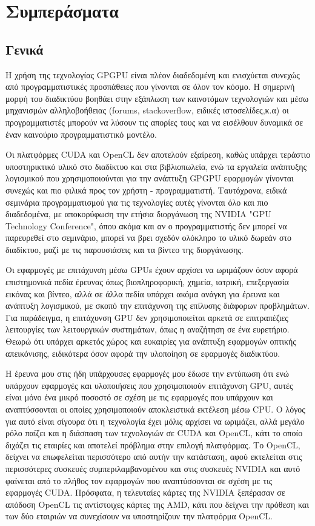 \chapter{Συμπεράσματα}
\section{Γενικά}
H χρήση της τεχνολογίας GPGPU είναι πλέον διαδεδομένη και ενισχύεται συνεχώς από προγραμματιστικές προσπάθειες που γίνονται σε όλον τον κόσμο. Η σημερινή μορφή του διαδικτύου βοηθάει στην εξάπλωση των καινοτόμων τεχνολογιών και μέσω μηχανισμών αλληλοβοήθειας (forums, stackoverflow, ειδικές ιστοσελίδες,κ.α) οι προγραμματιστές μπορούν να λύσουν τις απορίες τους και να εισέλθουν δυναμικά σε έναν καινούριο προγραμματιστικό μοντέλο.

Οι πλατφόρμες CUDA και OpenCL δεν αποτελούν εξαίρεση, καθώς υπάρχει τεράστιο υποστηρικτικό υλικό στο διαδίκτυο και στα βιβλιοπωλεία, ενώ τα εργαλεία ανάπτυξης λογισμικού που χρησιμοποιούνται για την ανάπτυξη GPGPU εφαρμογών γίνονται συνεχώς και πιο φιλικά προς τον χρήστη - προγραμματιστή. Ταυτόχρονα, ειδικά σεμινάρια προγραμματισμού για τις τεχνολογίες αυτές γίνονται όλο και πιο διαδεδομένα, με αποκορύφωση την ετήσια διοργάνωση της NVIDIA "GPU Technology Conference", όπου ακόμα και αν ο προγραμματιστής δεν μπορεί να παρευρεθεί στο σεμινάριο, μπορεί να βρει σχεδόν ολόκληρο το υλικό δωρεάν στο διαδίκτυο, μαζί με τις παρουσιάσεις και τα βίντεο της διοργάνωσης.

Οι εφαρμογές με επιτάχυνση μέσω GPUs έχουν αρχίσει να ωριμάζουν όσον αφορά επιστημονικά πεδία έρευνας όπως βιοπληροφορική, χημεία, ιατρική, επεξεργασία εικόνας και βίντεο, αλλά σε άλλα πεδία υπάρχει ακόμα ανάγκη για έρευνα και ανάπτυξη λογισμικού, με σκοπό την επιτάχυνση της επίλυσης διάφορων προβλημάτων. Για παράδειγμα, η επιτάχυνση GPU δεν χρησιμοποιείται αρκετά σε επιτραπέζιες λειτουργίες των λειτουργικών συστημάτων, όπως η αναζήτηση σε ένα ευρετήριο. Θεωρώ ότι υπάρχει αρκετός χώρος και ευκαιρίες για ανάπτυξη εφαρμογών οπτικής απεικόνισης, ειδικότερα όσον αφορά την υλοποίηση σε εφαρμογές διαδικτύου.

Η έρευνα μου στις ήδη υπάρχουσες εφαρμογές μου έδωσε την εντύπωση ότι ενώ υπάρχουν εφαρμογές και υλοποιήσεις που χρησιμοποιούν επιτάχυνση GPU, αυτές είναι μόνο ένα μικρό ποσοστό σε σχέση με τις εφαρμογές που υπάρχουν και αναπτύσσονται οι οποίες χρησιμοποιούν αποκλειστικά εκτέλεση μέσω CPU. Ο λόγος για αυτό είναι σίγουρα ότι η τεχνολογία έχει μόλις αρχίσει να ωριμάζει, αλλά μεγάλο ρόλο παίζει και η διάσπαση των τεχνολογιών σε CUDA και OpenCL, κάτι το οποίο διχάζει τις εταιρίες και αποτελεί πρόβλημα στην επιλογή πλατφόρμας. Το OpenCL, δείχνει να επωφελείται περισσότερο από αυτήν την κατάσταση, αφού εκτελείται στις περισσότερες συσκευές συμπεριλαμβανομένου και στις συσκευές NVIDIA και αυτό φαίνεται από το πλήθος τον εφαρμογών που αναπτύσσονται σε σχέση με τις εφαρμογές CUDA. Πρόσφατα, η τελευταίες κάρτες της NVIDIA ξεπέρασαν σε απόδοση OpenCL τις αντίστοιχες κάρτες της AMD, κάτι που δείχνει την πρόθεση και των δύο εταιριών να συνεχίσουν να υποστηρίζουν την πλατφόρμα OpenCL. 

